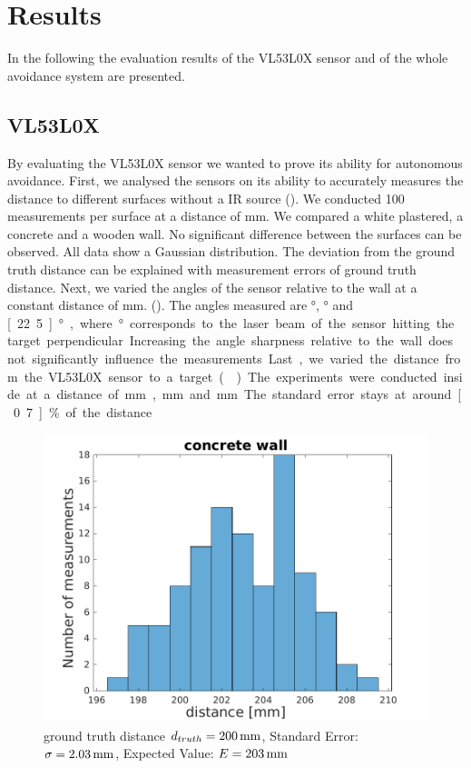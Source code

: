 \chapter{Results}
In the following the evaluation results of the VL53L0X sensor and of the whole avoidance system are presented. 
\section{VL53L0X}
\label{sec:vl53l0x}
By evaluating the VL53L0X sensor we wanted to prove its ability for autonomous avoidance. First, we analysed the sensors on its ability to accurately measures the distance to different surfaces without a IR source (). We conducted 100 measurements per surface at a distance of \unit[200]{mm}. We compared a white plastered, a concrete and a wooden wall. No significant difference between the surfaces can be observed. All data show a Gaussian distribution. The deviation from the ground truth distance can be explained with measurement errors of ground truth distance. Next, we varied the angles of the sensor relative to the wall at a constant distance of \unit[200]{mm}. (). The angles measured are \unit[90]{°}, \unit[45]{°} and \unit[22.5]{°}, where \unit[90]{°} corresponds to the laser beam of the sensor hitting the target perpendicular. Increasing the angle sharpness relative to the wall does not significantly influence the measurements. Last, we varied the distance from the VL53L0X sensor to a target (). The experiments were conducted inside at a distance of \unit[200]{mm}, \unit[500]{mm} and \unit[1000]{mm}. The standard error stays at around \unit[0.7]{\%} of the distance.\\
\begin{figure}
		\centering
		\includegraphics[width=0.9\linewidth]{pictures/concrete_hist.pdf}
		\caption{ground truth distance $d_{truth}= \unit[200]{mm}$, Standard Error: $\sigma=\unit[2.03]{mm}$, Expected Value: $E=\unit[203]{mm}$}
		\label{fig:surface_hist_con}
\end{figure}

